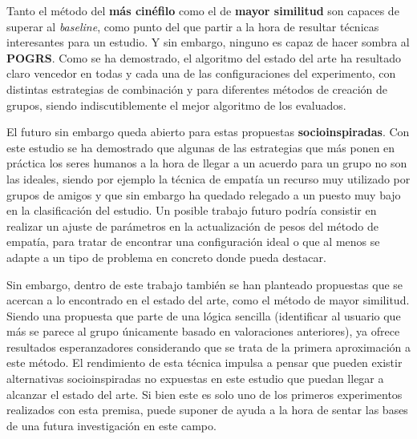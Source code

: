 Tanto el método del \textbf{más cinéfilo} como el de \textbf{mayor similitud} son capaces de superar al \textit{baseline}, como punto del que partir a la hora de resultar técnicas interesantes para un estudio. Y sin embargo, ninguno es capaz de hacer sombra al \textbf{POGRS}. Como se ha demostrado, el algoritmo del estado del arte ha resultado claro vencedor en todas y cada una de las configuraciones del experimento, con distintas estrategias de combinación y para diferentes métodos de creación de grupos, siendo indiscutiblemente el mejor algoritmo de los evaluados.

El futuro sin embargo queda abierto para estas propuestas \textbf{socioinspiradas}. Con este estudio se ha demostrado que algunas de las estrategias que más ponen en práctica los seres humanos a la hora de llegar a un acuerdo para un grupo no son las ideales, siendo por ejemplo la técnica de empatía un recurso muy utilizado por grupos de amigos y que sin embargo ha quedado relegado a un puesto muy bajo en la clasificación del estudio. Un posible trabajo futuro podría consistir en realizar un ajuste de parámetros en la actualización de pesos del método de empatía, para tratar de encontrar una configuración ideal o que al menos se adapte a un tipo de problema en concreto donde pueda destacar.

Sin embargo, dentro de este trabajo también se han planteado propuestas que se acercan a lo encontrado en el estado del arte, como el método de mayor similitud. Siendo una propuesta que parte de una lógica sencilla (identificar al usuario que más se parece al grupo únicamente basado en valoraciones anteriores), ya ofrece resultados esperanzadores considerando que se trata de la primera aproximación a este método. El rendimiento de esta técnica impulsa a pensar que pueden existir alternativas socioinspiradas no expuestas en este estudio que puedan llegar a alcanzar el estado del arte. Si bien este es solo uno de los primeros experimentos realizados con esta premisa, puede suponer de ayuda a la hora de sentar las bases de una futura investigación en este campo.